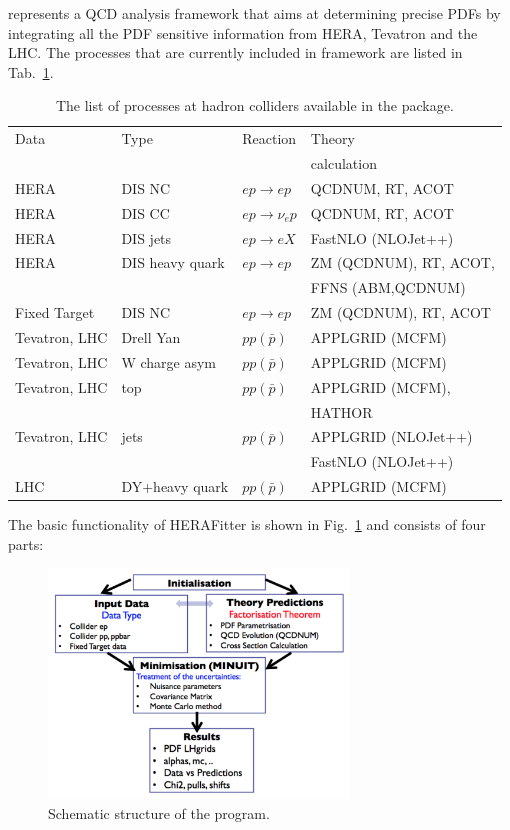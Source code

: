 \fitter represents a QCD analysis framework that aims at 
determining precise PDFs by integrating all the PDF sensitive information
from HERA, Tevatron and the LHC.
%
The processes that are currently included in \fitter framework are listed in Tab.~\ref{tab:proc}.
%
\begin{table}
\small
\scriptsize

\begin{tabular}{|l|l|l|l|}
\hline
Data &Type &  Reaction & Theory      \\
        &     &     & calculation \\
\hline

HERA &DIS NC   &$ep\to ep$ & QCDNUM, RT, ACOT \\
HERA &DIS CC   &$ep\to \nu_e p$ & QCDNUM, RT, ACOT\\
HERA &DIS jets &$ep\to eX$ & FastNLO (NLOJet++)\\
HERA &DIS heavy quark & $ep\to ep $& ZM (QCDNUM), RT, ACOT, \\
     &                     &            & FFNS (ABM,QCDNUM) \\
\hline
Fixed Target &DIS NC   &$ep\to ep$ & ZM (QCDNUM), RT, ACOT \\
\hline
Tevatron, LHC &Drell Yan &$pp(\bar p)$ & APPLGRID (MCFM) \\
Tevatron, LHC &W charge asym &$pp(\bar p)$ & APPLGRID (MCFM) \\
Tevatron, LHC &top &$pp(\bar p)$ & APPLGRID (MCFM),  \\
              &    &             & HATHOR \\
Tevatron, LHC &jets &$pp(\bar p)$ & APPLGRID (NLOJet++) \\
                &  & & FastNLO (NLOJet++) \\
LHC&  DY+heavy quark &$pp(\bar p)$ & APPLGRID (MCFM) \\
\hline
\end{tabular}
\caption{The list of processes at hadron colliders available in the \fitter package.}
\label{tab:proc}
\end{table}
%
\normalsize
The basic functionality of HERAFitter is shown in Fig.~\ref{fig:flow} and consists of four parts: %
\begin{figure}[!ht]
   \centering
   \includegraphics[width=8cm]{flow.pdf}
   \caption{Schematic structure of the \fitter program.} 
 \label{fig:flow}
\end{figure}
